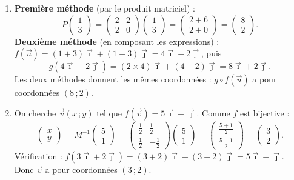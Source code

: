 \documentclass[11pt]{article}
\begin{document}
\begin{corrige}
\begin{enumerate}
\item \textbf{Première méthode} (par le produit matriciel) :
\[ P\begin{pmatrix} 1 \\ 3 \end{pmatrix}=\begin{pmatrix} 2 & 2 \\ 2 & 0 \end{pmatrix}\begin{pmatrix} 1 \\ 3 \end{pmatrix}=\begin{pmatrix} 2+6 \\ 2+0 \end{pmatrix}=\begin{pmatrix} 8 \\ 2 \end{pmatrix}. \]
\textbf{Deuxième méthode} (en composant les expressions) : $f(\vec{u})=(1+3)\vec{\imath}+(1-3)\vec{\jmath}=4\vec{\imath}-2\vec{\jmath}$, puis
\[ g(4\vec{\imath}-2\vec{\jmath})=(2\times4)\vec{\imath}+(4-2)\vec{\jmath}=8\vec{\imath}+2\vec{\jmath}. \]
Les deux méthodes donnent les mêmes coordonnées : $g\circ f(\vec{u})$ a pour coordonnées $(8\,;2)$.

\item On cherche $\vec{v}(x\,;y)$ tel que $f(\vec{v})=5\vec{\imath}+\vec{\jmath}$. Comme $f$ est bijective :
\[ \begin{pmatrix} x \\ y \end{pmatrix}=M^{-1}\begin{pmatrix} 5 \\ 1 \end{pmatrix}=\begin{pmatrix} \tfrac{1}{2} & \tfrac{1}{2} \\[2pt] \tfrac{1}{2} & -\tfrac{1}{2} \end{pmatrix}\begin{pmatrix} 5 \\ 1 \end{pmatrix}=\begin{pmatrix} \tfrac{5+1}{2} \\[2pt] \tfrac{5-1}{2} \end{pmatrix}=\begin{pmatrix} 3 \\ 2 \end{pmatrix}. \]
Vérification : $f(3\vec{\imath}+2\vec{\jmath})=(3+2)\vec{\imath}+(3-2)\vec{\jmath}=5\vec{\imath}+\vec{\jmath}$. Donc $\vec{v}$ a pour coordonnées $(3\,;2)$.


\end{enumerate}
\end{corrige}
\end{document}

